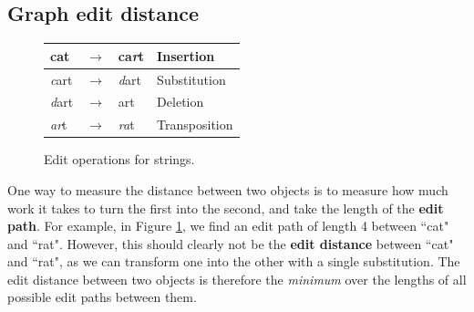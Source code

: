 \documentclass[12pt]{thesis}
\theoremstyle{plain}
\theoremstyle{definition}
\theoremstyle{remark}
\begin{document}
\subsection{Graph edit distance}

\begin{figure}
\begin{tabular}{|lcl|l|}
\hline
cat & $\rightarrow$ & ca\textit{r}t & Insertion \\ \hline
\textit{c}art & $\rightarrow$ & \textit{d}art & Substitution \\ \hline
\textit{d}art & $\rightarrow$ & art & Deletion \\ \hline
\textit{ar}t & $\rightarrow$ & \textit{ra}t & Transposition \\ \hline
\end{tabular}
\caption{Edit operations for strings.}
\vspace{-10pt}
\label{fig:string_edit_operations}
\end{figure}

One way to measure the distance between two objects is to measure how much work it takes to turn the first into the second, and take the length of the \textbf{edit path}. For example, in Figure \ref{fig:string_edit_operations}, we find an edit path of length 4 between ``cat" and ``rat". However, this should clearly not be the \textbf{edit distance} between ``cat" and ``rat", as we can transform one into the other with a single substitution. The edit distance between two objects is therefore the \textit{minimum} over the lengths of all possible edit paths between them.
\end{document}
